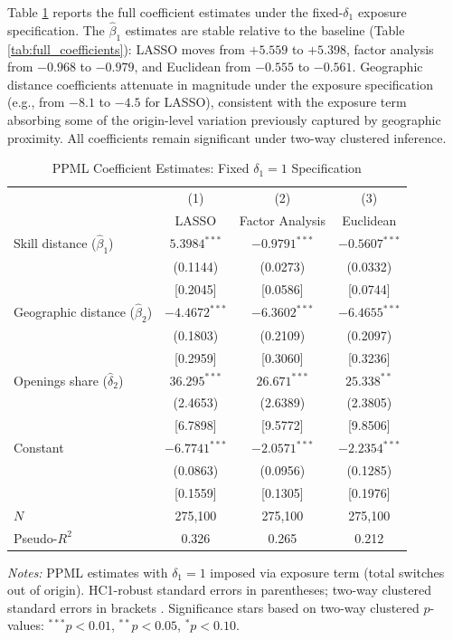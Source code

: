 \documentclass[12pt]{article}
\begin{document}
Table \ref{tab:fixed_coefficients} reports the full coefficient estimates under the fixed-$\delta_1$ exposure specification. The $\hat{\beta}_1$ estimates are stable relative to the baseline (Table \ref{tab:full_coefficients}): LASSO moves from $+5.559$ to $+5.398$, factor analysis from $-0.968$ to $-0.979$, and Euclidean from $-0.555$ to $-0.561$. Geographic distance coefficients attenuate in magnitude under the exposure specification (e.g., from $-8.1$ to $-4.5$ for LASSO), consistent with the exposure term absorbing some of the origin-level variation previously captured by geographic proximity. All coefficients remain significant under two-way clustered inference.

\begin{table}[H]
\centering
\caption{PPML Coefficient Estimates: Fixed $\delta_1 = 1$ Specification}
\label{tab:fixed_coefficients}
\begin{tabular}{lccc}
\toprule
 & (1) & (2) & (3) \\
 & LASSO & Factor Analysis & Euclidean \\
\midrule
Skill distance ($\hat{\beta}_1$) & $5.3984^{***}$ & $-0.9791^{***}$ & $-0.5607^{***}$ \\
 & (0.1144) & (0.0273) & (0.0332) \\
 & [0.2045] & [0.0586] & [0.0744]\\[0.5em]
Geographic distance ($\hat{\beta}_2$) & $-4.4672^{***}$ & $-6.3602^{***}$ & $-6.4655^{***}$ \\
 & (0.1803) & (0.2109) & (0.2097) \\
 & [0.2959] & [0.3060] & [0.3236]\\[0.5em]
Openings share ($\hat{\delta}_2$) & $36.295^{***}$ & $26.671^{***}$ & $25.338^{**}$ \\
 & (2.4653) & (2.6389) & (2.3805) \\
 & [6.7898] & [9.5772] & [9.8506]\\[0.5em]
Constant & $-6.7741^{***}$ & $-2.0571^{***}$ & $-2.2354^{***}$ \\
 & (0.0863) & (0.0956) & (0.1285) \\
 & [0.1559] & [0.1305] & [0.1976] \\
\midrule
$N$ & 275,100 & 275,100 & 275,100 \\
Pseudo-$R^2$ & 0.326 & 0.265 & 0.212 \\
\bottomrule
\end{tabular}
\begin{minipage}{0.9\textwidth}
\vspace{0.5em}
\footnotesize \textit{Notes:} PPML estimates with $\delta_1 = 1$ imposed via exposure term (total switches out of origin). HC1-robust standard errors in parentheses; two-way clustered standard errors in brackets \citep{cameron2011}. Significance stars based on two-way clustered $p$-values: $^{***}p<0.01$, $^{**}p<0.05$, $^{*}p<0.10$.
\end{minipage}
\end{table}
\end{document}
